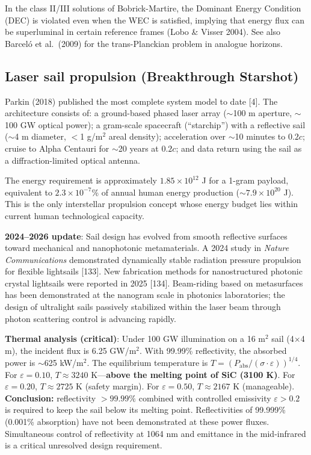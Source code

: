 \documentclass[11pt,a4paper,onecolumn]{article}
\begin{document}
In the class II/III solutions of Bobrick-Martire, the Dominant Energy Condition (DEC) is violated even when the WEC is satisfied, implying that energy flux can be superluminal in certain reference frames (Lobo \& Visser 2004). See also Barcel\'{o} et al.\ (2009) for the trans-Planckian problem in analogue horizons.

\subsection{Laser sail propulsion (Breakthrough Starshot)}

Parkin (2018) published the most complete system model to date [4]. The architecture consists of: a ground-based phased laser array ($\sim$100 m aperture, $\sim$100 GW optical power); a gram-scale spacecraft (``starchip'') with a reflective sail ($\sim$4 m diameter, $<$1 g/m$^2$ areal density); acceleration over $\sim$10 minutes to $0.2c$; cruise to Alpha Centauri for $\sim$20 years at $0.2c$; and data return using the sail as a diffraction-limited optical antenna.

The energy requirement is approximately $1.85\times10^{12}$ J for a 1-gram payload, equivalent to $2.3\times10^{-7}$\% of annual human energy production ($\sim7.9\times10^{20}$ J). This is the only interstellar propulsion concept whose energy budget lies within current human technological capacity.

\textbf{2024--2026 update}: Sail design has evolved from smooth reflective surfaces toward mechanical and nanophotonic metamaterials. A 2024 study in \textit{Nature Communications} demonstrated dynamically stable radiation pressure propulsion for flexible lightsails [133]. New fabrication methods for nanostructured photonic crystal lightsails were reported in 2025 [134]. Beam-riding based on metasurfaces has been demonstrated at the nanogram scale in photonics laboratories; the design of ultralight sails passively stabilized within the laser beam through photon scattering control is advancing rapidly.

\textbf{Thermal analysis (critical)}: Under 100 GW illumination on a 16 m$^2$ sail (4$\times$4 m), the incident flux is 6.25 GW/m$^2$. With 99.99\% reflectivity, the absorbed power is $\sim$625 kW/m$^2$. The equilibrium temperature is $T = (P_{\text{abs}}/(\sigma\cdot\varepsilon))^{1/4}$. For $\varepsilon = 0.10$, $T \approx 3240$ K---\textbf{above the melting point of SiC (3100 K)}. For $\varepsilon = 0.20$, $T \approx 2725$ K (safety margin). For $\varepsilon = 0.50$, $T \approx 2167$ K (manageable). \textbf{Conclusion:} reflectivity $>99.99\%$ combined with controlled emissivity $\varepsilon > 0.2$ is required to keep the sail below its melting point. Reflectivities of 99.999\% (0.001\% absorption) have not been demonstrated at these power fluxes. Simultaneous control of reflectivity at 1064 nm and emittance in the mid-infrared is a critical unresolved design requirement.
\end{document}
